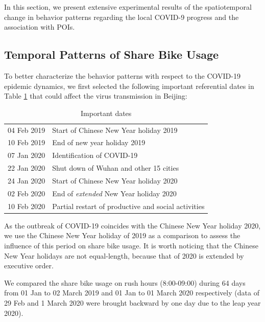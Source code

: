 \documentclass[ijgi,submit,moreauthors,pdftex]{Definitions/mdpi}
\begin{document}
In this section, we present extensive experimental results of the spatiotemporal change in behavior patterns regarding the local COVID-9 progress and the association with POIs.

\subsection{Temporal Patterns of Share Bike Usage}
To better characterize the behavior patterns with respect to the COVID-19 epidemic dynamics, we first selected the following important referential dates in Table \ref{tab:important_dates} that could affect the virus transmission in Beijing: 

\begin{table}[ht]
    \centering
    \begin{tabular}{ll}
    04 Feb 2019 & Start of Chinese New Year holiday 2019\\
    10 Feb 2019 & End of new year holiday 2019\\
    07 Jan 2020 & Identification of COVID-19\\
    22 Jan 2020 & Shut down of Wuhan and other 15 cities\\
    24 Jan 2020 & Start of Chinese New Year holiday 2020\\
    02 Feb 2020 & End of \textit{extended} New Year holiday 2020\\
    10 Feb 2020 & Partial restart of productive and social activities
    \end{tabular}
    \caption{Important dates}
    \label{tab:important_dates}
\end{table}

As the outbreak of COVID-19 coincides with the Chinese New Year holiday 2020, we use the Chinese New Year holiday of 2019 as a comparison to assess the influence of this period on share bike usage.
It is worth noticing that the Chinese New Year holidays are not equal-length, because that of 2020 is extended by executive order.

We compared the share bike usage on rush hours (8:00-09:00) during 64 days from 01 Jan to 02 March 2019 and 01 Jan to 01 March 2020 respectively (data of 29 Feb and 1 March 2020 were brought backward by one day due to the leap year 2020).
\end{document}

